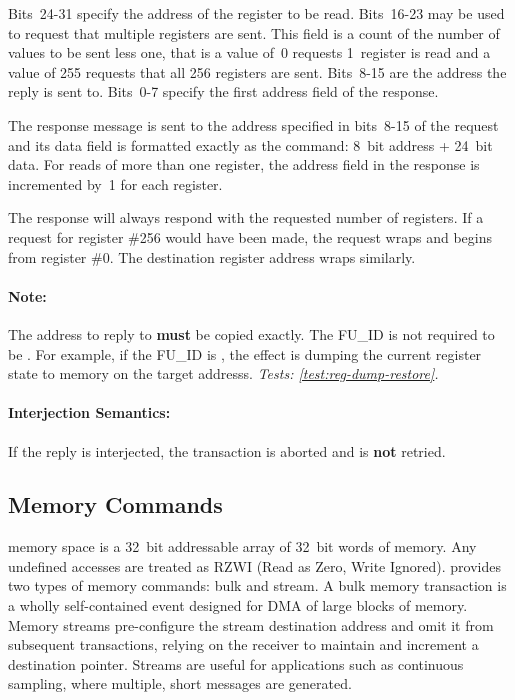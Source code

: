 Bits~24-31 specify the address of the register to be read. Bits~16-23 may be
used to request that multiple registers are sent. This field is a count of the
number of values to be sent less one, that is a value of~0 requests 1~register
is read and a value of 255 requests that all 256 registers are sent. Bits~8-15
are the \bus address the reply is sent to. Bits~0-7 specify the first address
field of the  response.

The response message is sent to the \bus address specified in bits~8-15 of the
request and its data field is formatted exactly as the
 command: 8~bit address + 24~bit data. For reads
of more than one register, the address field in the response is incremented
by~1 for each register.

The response will always respond with the requested number of registers. If a
request for register \#256 would have been made, the request wraps and begins
from register \#0. The destination register address wraps similarly.

\paragraph{Note:} The \bus address to reply to {\bf must} be copied
exactly. The FU\_ID is not required to be . For
example, if the FU\_ID is , the effect is
dumping the current register state to memory on the target addresss.
{\em Tests: \ref{test:reg-dump-restore}.}

\paragraph{Interjection Semantics:} If the reply is interjected, the
transaction is aborted and is {\bf not} retried.

\subsection{Memory Commands}
\label{cmd:mem}
\proto memory space is a 32~bit addressable array of 32~bit words of memory.
Any undefined accesses are treated as RZWI (Read as Zero, Write Ignored).
\proto provides two types of memory commands: bulk and stream. A bulk memory
transaction is a wholly self-contained event designed for DMA of large blocks
of memory. Memory streams pre-configure the stream destination address and
omit it from subsequent transactions, relying on the receiver to maintain and
increment a destination pointer. Streams are useful for applications such as
continuous sampling, where multiple, short messages are generated.

